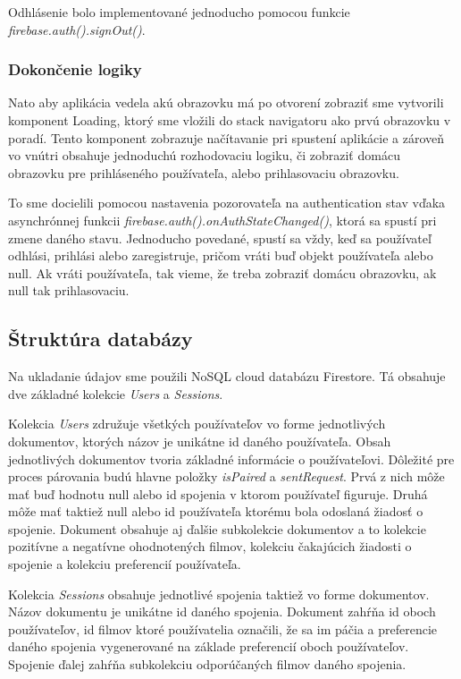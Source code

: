 Odhlásenie bolo implementované jednoducho pomocou funkcie \textit{firebase.auth().signOut()}.
\subsubsection{Dokončenie logiky}
Nato aby aplikácia vedela akú obrazovku má po otvorení zobraziť sme vytvorili komponent Loading, ktorý sme vložili do stack navigatoru ako prvú obrazovku v poradí. Tento komponent zobrazuje načítavanie pri spustení aplikácie a zároveň vo vnútri obsahuje jednoduchú rozhodovaciu logiku, či zobraziť domácu obrazovku pre prihláseného používateľa, alebo prihlasovaciu obrazovku. 

To sme docielili pomocou nastavenia pozorovateľa na authentication stav vďaka asynchrónnej funkcii \textit{firebase.auth().onAuthStateChanged()}, ktorá sa spustí pri zmene daného stavu. Jednoducho povedané, spustí sa vždy, keď sa používateľ odhlási, prihlási alebo zaregistruje, pričom vráti buď objekt používateľa alebo null. Ak vráti používateľa, tak vieme, že treba zobraziť domácu obrazovku, ak null tak prihlasovaciu.
\subsection{Štruktúra databázy}
Na ukladanie údajov sme použili NoSQL cloud databázu Firestore. Tá obsahuje dve základné kolekcie \textit{Users} a  \textit{Sessions}. 

Kolekcia \textit{Users} združuje všetkých používateľov vo forme jednotlivých dokumentov, ktorých názov je unikátne id daného používateľa. Obsah jednotlivých dokumentov tvoria základné informácie o používateľovi. Dôležité pre proces párovania budú hlavne položky \textit{isPaired} a \textit{sentRequest}. Prvá z nich môže mať buď hodnotu null alebo id spojenia v ktorom používateľ figuruje. Druhá môže mať taktiež null alebo id používateľa ktorému bola odoslaná žiadosť o spojenie. Dokument obsahuje aj ďalšie subkolekcie dokumentov a to kolekcie pozitívne a negatívne ohodnotených filmov, kolekciu čakajúcich žiadosti o spojenie a kolekciu preferencií používateľa.

Kolekcia \textit{Sessions} obsahuje jednotlivé spojenia taktiež vo forme dokumentov. Názov dokumentu je unikátne id daného spojenia. Dokument zahŕňa id oboch používateľov, id filmov ktoré používatelia označili, že sa im páčia a preferencie daného spojenia vygenerované na základe preferencií oboch používateľov. Spojenie ďalej zahŕňa subkolekciu odporúčaných filmov daného spojenia. 
\vspace{55mm}

